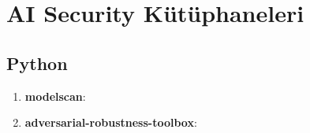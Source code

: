 \section{AI Security Kütüphaneleri}

\subsection{Python}
\begin{enumerate}
    \item \textbf{modelscan}:
    \item \textbf{adversarial-robustness-toolbox}:
\end{enumerate}

\newpage
